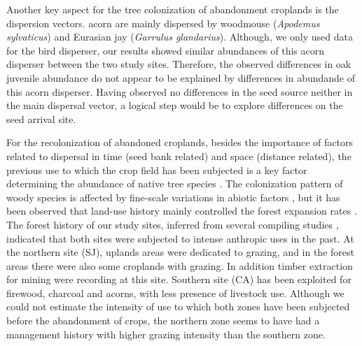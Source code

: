 Another key aspect for the tree colonization of abandonment croplands is the dispersion vectors. \Qp acorn are mainly dispersed by woodmouse (\emph{Apodemus sylvaticus}) and Eurasian jay (\emph{Garrulus glandarius})\autocites{Gomez2003ImpactVertebrate,Pereaetal2014InteraccionesPlantaanimal}. Although, we only used data for the bird disperser, our results showed similar abundances of this acorn disperser between the two study sites. Therefore, the observed differences in oak juvenile abundance do not appear to be explained by differences in abundande of this acorn disperser. Having observed no differences in the seed source neither in the main dispersal vector, a logical step would be to explore differences on the seed arrival site. 

For the recolonization of abandoned croplands, besides the importance of factors related to dispersal in time (seed bank related) and space (distance related), the previous use to which the crop field has been subjected is a key factor determining the abundance of native tree species \autocites{HermyVerheyen2007LegaciesPresentday,NavarroGonzalezetal2013WeightLanduse}. The colonization pattern of woody species is affected by fine-scale variations in abiotic factors \autocite{Milderetal2013ColonizationPatterns,Leverkusetal2016ShiftingDemographic}, but it has been observed that land-use history mainly controlled the forest expansion rates \autocites{AlvarezMartinezetal2014InfluenceLand,Perringetal2016GlobalEnvironmental}. The forest history of our study sites, inferred from several compiling studies \autocites{MorenoLlorcaetal2014CaracterizacionFuentes, Titos1997, PerezLuqueetal2020LanduseLegacies,MorenoLlorcaetal2016HistoricalAnalysis,MesaTorres2009,JimenezOlivenciaetal2015EvolucionUsos}, indicated that both sites were subjected to intense anthropic uses in the past. At the northern site (SJ), uplands areas were dedicated to grazing, and in the forest areas there were also some croplands with grazing. In addition timber extraction for mining were recording at this site. Southern site (CA) has been exploited for firewood, charcoal and acorns, with less presence of livestock use. Although we could not estimate the intensity of use to which both zones have been subjected before the abandonment of crops, the northern zone seems to have had a management history with higher grazing intensity than the southern zone. 
